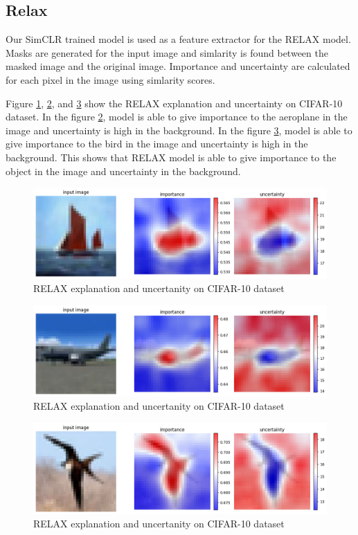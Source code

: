 \subsection{Relax}
Our SimCLR trained model is used as a feature extractor for the RELAX\cite{wickstrom2023relax} model. Masks are generated for the input image and simlarity is found between the masked image and the original image. Importance and uncertainty are calculated for each pixel in the image using simlarity scores.

Figure \ref{fig:result1}, \ref{fig:result2}, and \ref{fig:result3} show the RELAX explanation and uncertainty on CIFAR-10 dataset. In the figure \ref{fig:result2}, model is able to give importance to the aeroplane in the image and uncertainty is high in the background. In the figure \ref{fig:result3}, model is able to give importance to the bird in the image and uncertainty is high in the background. This shows that RELAX model is able to give importance to the object in the image and uncertainty in the background. 
\begin{figure}[h]
    \centering
    \includegraphics[width=1.0\linewidth]{images/Result1.png}
    \caption{RELAX explanation and uncertanity on CIFAR-10 dataset}
    \label{fig:result1}
\end{figure}
\begin{figure}[h]
    \centering
    \includegraphics[width=1.0\linewidth]{images/Result2.png}
    \caption{RELAX explanation and uncertanity on CIFAR-10 dataset}
    \label{fig:result2}
\end{figure}
\begin{figure}[h]
    \centering
    \includegraphics[width=1.0\linewidth]{images/Result3.png}
    \caption{RELAX explanation and uncertanity on CIFAR-10 dataset}
    \label{fig:result3}
\end{figure}
